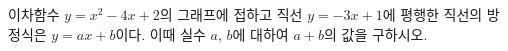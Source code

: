 이차함수 $y=x^2-4x+2$의 그래프에 접하고 직선 $y=-3x+1$에 평행한 직선의 방정식은 $y=ax+b$이다. 이때 실수 $a$, $b$에 대하여 $a+b$의 값을 구하시오.
